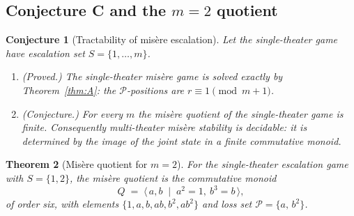 \documentclass[11pt]{article}
\theoremstyle{plain}
\newtheorem{theorem}{Theorem}[section]
\newtheorem{conjecture}[theorem]{Conjecture}
\theoremstyle{definition}
\theoremstyle{remark}
\begin{document}
\subsection{Conjecture C and the \texorpdfstring{$m=2$}{m=2} quotient}

\begin{conjecture}[Tractability of mis\`ere escalation]\label{conj:C}
Let the single-theater game have escalation set $S=\{1,\dots,m\}$.
\begin{enumerate}
\item[(1)] (Proved.) The single-theater mis\`ere game is solved exactly by
Theorem~\ref{thm:A}: the $\mathcal{P}$-positions are $r\equiv 1\pmod{m+1}$.
\item[(2)] (Conjecture.) For every $m$ the mis\`ere quotient of the
single-theater game is finite. Consequently multi-theater mis\`ere stability
is decidable: it is determined by the image of the joint state in a finite
commutative monoid.
\end{enumerate}
\end{conjecture}

\begin{theorem}[Mis\`ere quotient for $m=2$]\label{thm:misere2}
For the single-theater escalation game with $S=\{1,2\}$, the mis\`ere
quotient is the commutative monoid
\[
  Q \;=\; \langle\, a,b \;\mid\; a^2=1,\ b^3=b \,\rangle,
\]
of order six, with elements $\{1,a,b,ab,b^2,ab^2\}$ and loss set
$\mathcal{P}=\{a,\,b^2\}$.
\end{theorem}
\end{document}
